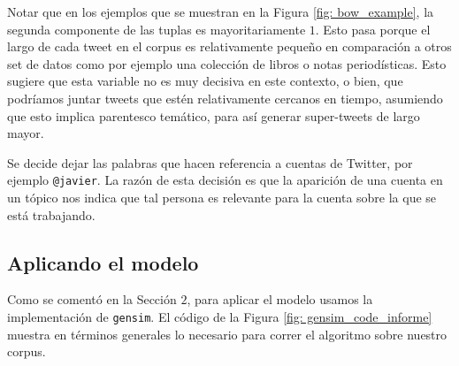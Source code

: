 \documentclass{article}
\begin{document}
	\begin{remark}
		Notar que en los ejemplos que se muestran en la Figura \ref{fig: bow_example}, la segunda componente de las tuplas es mayoritariamente $1$. Esto pasa porque el largo de cada tweet en el corpus es relativamente pequeño en comparación a otros set de datos como por ejemplo una colección de libros o notas periodísticas. Esto sugiere que esta variable no es muy decisiva en este contexto, o bien, que podríamos juntar tweets que estén relativamente cercanos en tiempo, asumiendo que esto implica parentesco temático, para así generar super-tweets de largo mayor. 
	\end{remark}

	\begin{remark}
		Se decide dejar las palabras que hacen referencia a cuentas de Twitter, por ejemplo \texttt{@javier}. La razón de esta decisión es que la aparición de una cuenta en un tópico nos indica que tal persona es relevante para la cuenta sobre la que se está trabajando.
	\end{remark}

	\subsection{Aplicando el modelo}
	Como se comentó en la Sección $2$, para aplicar el modelo usamos la implementación de \texttt{gensim}. El código de la Figura \ref{fig: gensim_code_informe} muestra en términos generales lo necesario para correr el algoritmo sobre nuestro corpus.
	
\end{document}
